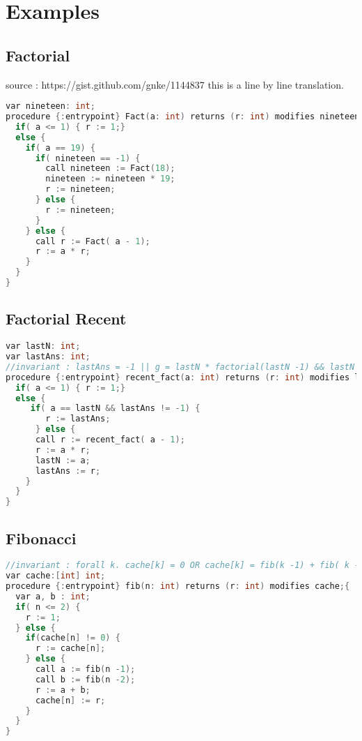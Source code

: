 \section{Examples}

\subsection{Factorial}
source : https://gist.github.com/gnke/1144837
this is a line by line translation.

\begin{lstlisting}[language=c, caption= {Procedure `factorial' :
      returns factorial of `n' and memoizes result for argument value
      `19'.}, label=lst:factImpl]
var nineteen: int;
procedure {:entrypoint} Fact(a: int) returns (r: int) modifies nineteen;{
  if( a <= 1) { r := 1;}
  else {
    if( a == 19) {
      if( nineteen == -1) {
        call nineteen := Fact(18);
        nineteen := nineteen * 19;
        r := nineteen;
      } else {
        r := nineteen;
      }
    } else {
      call r := Fact( a - 1);
      r := a * r;
    }
  }
}
\end{lstlisting}

\subsection{Factorial Recent}
\begin{lstlisting}[language=c, caption= {Procedure `recent\_fact' :
      returns factorial of `n' and memoizes result for the last argument value.}, label=lst:factorialRecent]
var lastN: int;
var lastAns: int;
//invariant : lastAns = -1 || g = lastN * factorial(lastN -1) && lastN >1 
procedure {:entrypoint} recent_fact(a: int) returns (r: int) modifies lastN, lastAns;{
  if( a <= 1) { r := 1;}
  else {
     if( a == lastN && lastAns != -1) {
        r := lastAns;
      } else {
      call r := recent_fact( a - 1);    
      r := a * r;
      lastN := a;
      lastAns := r;
    }
  }
}
\end{lstlisting}

\subsection{Fibonacci}
\begin{lstlisting}[language=c, caption= {Procedure `fib' :
      returns the n'th fibonacci number}, label=lst:factorialSimple]
//invariant : forall k. cache[k] = 0 OR cache[k] = fib(k -1) + fib( k -2)
var cache:[int] int;
procedure {:entrypoint} fib(n: int) returns (r: int) modifies cache;{
  var a, b : int;
  if( n <= 2) {
    r := 1;
  } else {
    if(cache[n] != 0) {
      r := cache[n];
    } else {
      call a := fib(n -1);
      call b := fib(n -2);
      r := a + b;
      cache[n] := r;
    }
  }
}
\end{lstlisting}
